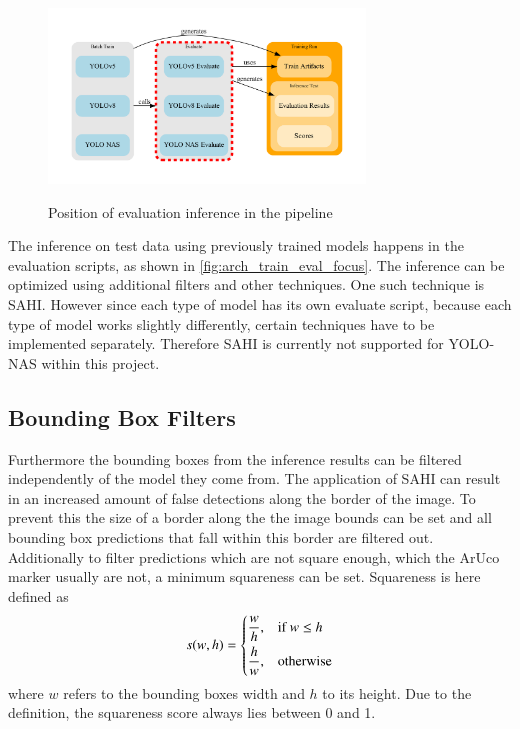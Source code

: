 \documentclass[10pt]{book}
\begin{document}
\begin{figure}
  \caption{Position of evaluation inference in the pipeline}
  \includegraphics[width=0.75\textwidth]{graph/arch_train_eval_focus}
  \label{fig:arch_train_eval_focus}
\end{figure}

The inference on test data using previously trained models happens in the evaluation scripts, as shown in \autoref{fig:arch_train_eval_focus}. The inference can be optimized using additional filters and other techniques. One such technique is \ac{SAHI}. However since each type of model has its own evaluate script, because each type of model works slightly differently, certain techniques have to be implemented separately. Therefore \ac{SAHI} is currently not supported for \ac{YOLO}-NAS within this project.

\subsection{Bounding Box Filters}

Furthermore the bounding boxes from the inference results can be filtered independently of the model they come from. The application of \ac{SAHI} can result in an increased amount of false detections along the border of the image. To prevent this the size of a border along the the image bounds can be set and all bounding box predictions that fall within this border are filtered out. Additionally to filter predictions which are not square enough, which the \ac{ArUco} marker usually are not, a minimum squareness can be set. Squareness is here defined as $$ 
s(w,h)=
\begin{dcases}
    \frac{w}{h}, & \text{if } w\leq h\\
    \frac{h}{w}, & \text{otherwise}
\end{dcases} $$ where $w$ refers to the bounding boxes width and $h$ to its height. Due to the definition, the squareness score always lies between 0 and 1.
\end{document}
